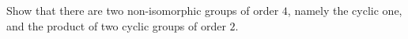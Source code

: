 \begin{exercise}
	Show that there are two non-isomorphic groups of order $4$, namely the cyclic one, and the product of two cyclic groups of order $2$.
\end{exercise}
